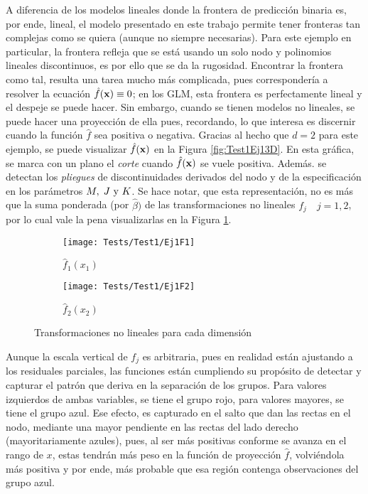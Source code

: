 \documentclass[../Main/Main.tex]{subfiles}
\begin{document}
A diferencia de los modelos lineales donde la frontera de predicción binaria es, por ende, lineal, el modelo presentado en este trabajo permite tener fronteras tan complejas como se quiera (aunque no siempre necesarias). Para este ejemplo en particular, la frontera refleja que se está usando un solo nodo y polinomios lineales discontinuos, es por ello que se da la rugosidad. Encontrar la frontera como tal, resulta una tarea mucho más complicada, pues correspondería a resolver la ecuación  $\hat{f}(\mathbf{x}) \equiv 0$; en los GLM, esta frontera es perfectamente lineal y el despeje se puede hacer. Sin embargo, cuando se tienen modelos no lineales, se puede hacer una proyección de ella pues, recordando, lo que interesa es discernir cuando la función $\hat{f}$ sea positiva o negativa. Gracias al hecho que $d = 2$ para este ejemplo, se puede visualizar $\hat{f}(\mathbf{x})$ en la Figura \ref{fig:Test1Ej13D}. En esta gráfica, se marca con un plano el \textit{corte} cuando $\hat{f}(\mathbf{x})$ se vuele positiva. Además. se detectan los \textit{pliegues} de discontinuidades derivados del nodo y de la especificación en los parámetros $M,\;J\text{ y }K$. Se hace notar, que esta representación, no es más que la suma ponderada (por $\hat{\beta})$ de las transformaciones no lineales $f_j \quad j=1,2$, por lo cual vale la pena visualizarlas en la Figura \ref{fig:Test1Ej1Fs}. 
\begin{figure}[h]
    \begin{subfigure}[b]{0.45\textwidth}
        \texttt{[image: Tests/Test1/Ej1F1]}
        \caption{$\hat{f}_1(x_1)$}
    \end{subfigure}
	\hfill
	    \begin{subfigure}[b]{0.45\textwidth}
        \texttt{[image: Tests/Test1/Ej1F2]}
        \caption{$\hat{f}_2(x_2)$}
    \end{subfigure}
    \caption{Transformaciones no lineales para cada dimensión}\label{fig:Test1Ej1Fs}
\end{figure}
Aunque la escala vertical de $f_j$ es arbitraria, pues en realidad  están ajustando a los residuales parciales, las funciones están cumpliendo su propósito de detectar y capturar el patrón que deriva en la separación de los grupos. Para valores izquierdos de ambas variables, se tiene el grupo rojo, para valores mayores, se tiene el grupo azul. Ese efecto, es capturado en el salto que dan las rectas en el nodo, mediante una mayor pendiente en las rectas del lado derecho (mayoritariamente azules), pues, al ser más positivas conforme se avanza en el rango de $x$, estas tendrán más peso en la función de proyección $\hat{f}$, volviéndola más positiva y por ende, más probable que esa región contenga observaciones del grupo azul.
\end{document}
